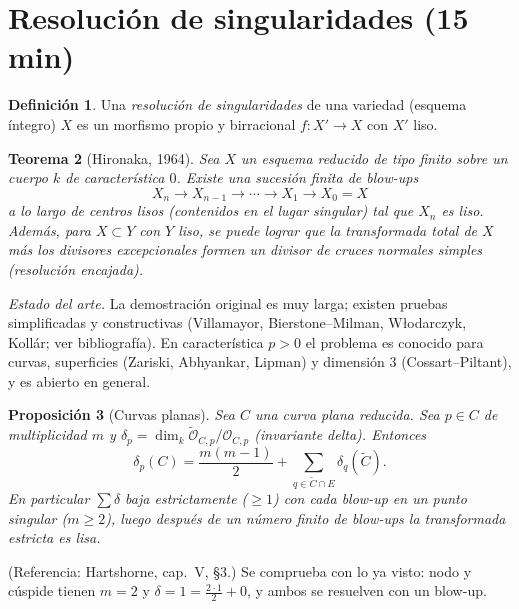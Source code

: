 \documentclass[11pt,a4paper]{article}
\newcommand{\cO}{\mathcal{O}}
\theoremstyle{plain}
\newtheorem{teorema}{Teorema}[section]
\newtheorem{proposicion}[teorema]{Proposición}
\theoremstyle{definition}
\newtheorem{definicion}[teorema]{Definición}
\theoremstyle{remark}
\begin{document}
\section{Resolución de singularidades (15 min)}

\begin{definicion}
Una \emph{resolución de singularidades} de una variedad (esquema íntegro) $X$ es un morfismo propio y birracional $f\colon X'\to X$ con $X'$ liso.
\end{definicion}

\begin{teorema}[Hironaka, 1964]\label{teo:hironaka}
Sea $X$ un esquema reducido de tipo finito sobre un cuerpo $k$ de característica $0$. Existe una sucesión finita de blow-ups
\[
X_n\to X_{n-1}\to\cdots\to X_1\to X_0=X
\]
a lo largo de centros \emph{lisos} (contenidos en el lugar singular) tal que $X_n$ es liso. Además, para $X\subset Y$ con $Y$ liso, se puede lograr que la transformada total de $X$ más los divisores excepcionales formen un divisor de cruces normales simples (resolución \emph{encajada}).
\end{teorema}

\noindent\emph{Estado del arte.} La demostración original es muy larga; existen pruebas simplificadas y constructivas (Villamayor, Bierstone--Milman, Włodarczyk, Kollár; ver bibliografía). En característica $p>0$ el problema es conocido para curvas, superficies (Zariski, Abhyankar, Lipman) y dimensión $3$ (Cossart--Piltant), y es abierto en general.

\begin{proposicion}[Curvas planas]\label{prop:curvas}
Sea $C$ una curva plana reducida. Sea $p\in C$ de multiplicidad $m$ y $\delta_p=\dim_k\widetilde{\cO}_{C,p}/\cO_{C,p}$ (invariante delta). Entonces
\[
\delta_p(C)=\frac{m(m-1)}2+\sum_{q\in\tilde C\cap E}\delta_q(\tilde C).
\]
En particular $\sum\delta$ baja estrictamente ($\ge1$) con cada blow-up en un punto singular ($m\ge2$), luego después de un número finito de blow-ups la transformada estricta es lisa.
\end{proposicion}

\noindent(Referencia: Hartshorne, cap.~V, \S3.) Se comprueba con lo ya visto: nodo y cúspide tienen $m=2$ y $\delta=1=\tfrac{2\cdot1}{2}+0$, y ambos se resuelven con un blow-up.
\end{document}
